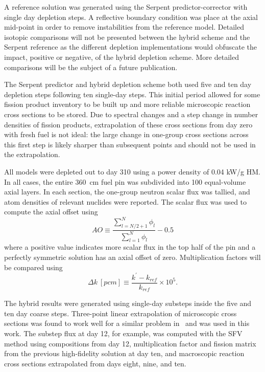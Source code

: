 \documentclass[letterpaper]{mc2021}
\begin{document}
A reference solution was generated using the Serpent predictor-corrector with
single day depletion steps.
A reflective boundary condition was place at the axial mid-point in order to remove
instabilities from the reference model.
Detailed isotopic comparisons will not be presented between the hybrid scheme and the
Serpent reference as the different depletion implementations would obfuscate the impact,
positive or negative, of the hybrid depletion scheme.
More detailed comparisons will be the subject of a future publication.

The Serpent predictor and hybrid depletion scheme both used five and ten day depletion
steps following ten single-day steps.
This initial period allowed for some fission product inventory to be built up and more
reliable microscopic reaction cross sections to be stored.
Due to spectral changes and a step change in number densities of fission products,
extrapolation of these cross sections from day zero with fresh fuel is not ideal:
the large change in one-group cross sections across this first step is likely
sharper than subsequent points and should not be used in the extrapolation.

All models were depleted out to day 310 using a power density of 0.04 kW/g HM.
In all cases, the entire 360\ cm fuel pin was subdivided into 100 equal-volume
axial layers.
In each section, the one-group neutron scalar flux was tallied, and atom densities
of relevant nuclides were reported.
The scalar flux was used to compute the axial offset using
\begin{equation} \label{eq-ao}
    AO \equiv \frac{
        \sum_{l=N/2+1}^N\phi_l
    }{
        \sum_{l=1}^{N}\phi_l
    } - 0.5
\end{equation}
where a positive value indicates more scalar flux in the top half of the pin
and a perfectly symmetric solution has an axial offset of zero.
Multiplication factors will be compared using
\begin{equation} \label{eq-dk}
    \Delta k\ [pcm] \equiv \frac{k^\prime - k_{ref}}{k_{ref}} \times 10^5.
\end{equation}

The hybrid results were generated using single-day substeps inside the five and
ten day coarse steps.
Three-point linear extrapolation of microscopic cross sections was found to work
well for a similar problem in~\cite{Johnson2020TransportFreeMethod} and
was used in this work.
The substep flux at day 12, for example, was computed with
    the SFV method using compositions from day 12,
    multiplication factor and fission matrix from the previous high-fidelity solution at day ten, and
    macroscopic reaction cross sections extrapolated from days eight, nine, and ten.
\end{document}
